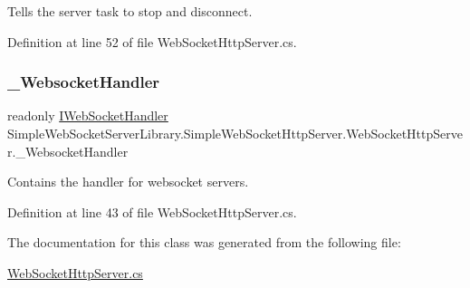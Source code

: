 Tells the server task to stop and disconnect. 



Definition at line 52 of file Web\+Socket\+Http\+Server.\+cs.

\mbox{\label{class_simple_web_socket_server_library_1_1_simple_web_socket_http_server_1_1_web_socket_http_server_a4de0d450cb58e0ddabc5a270dd7806c8}} 
\subsubsection{\texorpdfstring{\+\_\+\+Websocket\+Handler}{\_WebsocketHandler}}
{\footnotesize\ttfamily readonly \mbox{\hyperlink{interface_simple_web_socket_server_library_1_1_simple_web_socket_handler_1_1_i_web_socket_handler}{I\+Web\+Socket\+Handler}} Simple\+Web\+Socket\+Server\+Library.\+Simple\+Web\+Socket\+Http\+Server.\+Web\+Socket\+Http\+Server.\+\_\+\+Websocket\+Handler\hspace{0.3cm}{\ttfamily [private]}}



Contains the handler for websocket servers. 



Definition at line 43 of file Web\+Socket\+Http\+Server.\+cs.



The documentation for this class was generated from the following file\+:\begin{DoxyCompactItemize}
\item 
\mbox{\hyperlink{_web_socket_http_server_8cs}{Web\+Socket\+Http\+Server.\+cs}}\end{DoxyCompactItemize}
